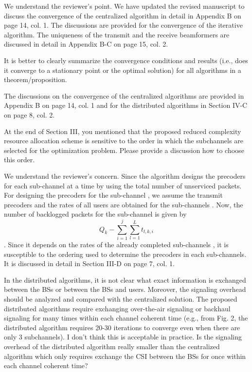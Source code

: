 \begin{itemize}
\resp We understand the reviewer's point. We have updated the revised manuscript to discuss the convergence of the centralized algorithm in detail in Appendix B on page 14, col. 1. The discussions are provided for the convergence of the iterative algorithm. The uniqueness of the transmit and the receive beamformers are discussed in detail in Appendix B-C on page 15, col. 2.

 It is better to clearly summarize the convergence conditions and results (i.e., does it converge to a stationary point or the optimal solution) for all algorithms in a theorem/proposition.

\resp The discussions on the convergence of the centralized algorithms are provided in Appendix B on page 14, col. 1 and for the distributed algorithms in Section IV-C on page 8, col. 2.

 At the end of Section III, you mentioned that the proposed reduced complexity resource allocation scheme is sensitive to the order in which the subchannels are selected for the optimization problem. Please provide a discussion how to choose this order.

\resp We understand the reviewer's concern. Since the algorithm designs the precoders for each sub-channel at a time by using the total number of unserviced packets. For designing the precoders for the sub-channel , we assume the transmit precoders and the rates of all users are obtained for the sub-channels . Now, the number of backlogged packets for the  sub-channel is given by 
\[Q_k - \sum_{i=1}^j \sum_{l=1}^L t_{l,k,i}\].
Since it depends on the rates of the already completed sub-channels , it is susceptible to the ordering used to determine the precoders in each sub-channels. It is discussed in detail in Section III-D on page 7, col. 1.

 In the distributed algorithms, it is not clear what exact information is exchanged between the BSs or between the BSs and users. Moreover, the signaling overhead should be analyzed and compared with the centralized solution. The proposed distributed algorithms require exchanging over-the-air signaling or backhaul signaling for many times within each channel coherent time (e.g., from Fig. 2, the distributed algorithm requires 20-30 iterations to converge even when there are only 3 subchannels). I don’t think this is acceptable in practice. Is the signaling overhead of the distributed algorithm really smaller than the centralized algorithm which only requires exchange the CSI between the BSs for once within each channel coherent time?


\end{itemize}
